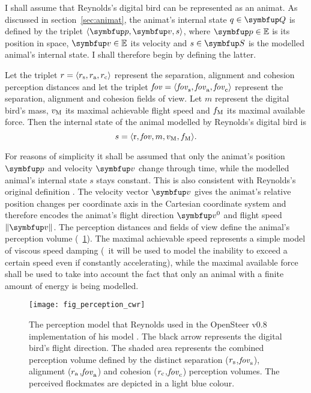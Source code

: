 I shall assume that Reynolds's digital bird can be represented as an animat. As discussed in section~\ref{sec:animat}, the animat's internal state $q \in \set{Q}$ is defined by the triplet $\langle\vect{p},\vect{v},s\rangle$, where $\vect{p} \in \E$ is its position in space, $\vect{v} \in \E$ its velocity and $s \in \set{S}$ is the modelled animal's internal state. I shall therefore begin by defining the latter.

\begin{definition}
  \label{def:animat:s:cwr}
  Let the triplet $r=\langle r_\textnormal{s}, r_\textnormal{a}, r_\textnormal{c}\rangle$ represent the separation, alignment and cohesion perception distances and let the triplet $\mathit{fov}=\langle\mathit{fov}_\textnormal{s}, \mathit{fov}_\textnormal{a}, \mathit{fov}_\textnormal{c}\rangle$ represent the separation, alignment and cohesion fields of view. Let $m$ represent the digital bird's mass, $v_\textnormal{M}$ its maximal achievable flight speed and $f_\textnormal{M}$ its maximal available force. Then the internal state of the animal modelled by Reynolds's digital bird is
  \begin{equation}
  s=\langle \mathrm{r}, \mathit{fov}, m, v_\textnormal{M}, f_\textnormal{M} \rangle.
  \end{equation}
\end{definition}

For reasons of simplicity it shall be assumed that only the animat's position $\vect{p}$ and velocity $\vect{v}$ change through time, while the modelled animal's internal state $s$ stays constant. This is also consistent with Reynolds's original definition \cite{reynolds:1987}. The velocity vector $\vect{v}$ gives the animat's relative position changes per coordinate axis in the Cartesian coordinate system and therefore encodes the animat's flight direction $\vect{v}^0$ and flight speed $\left\|\vect{v}\right\|$. The perception distances and fields of view define the animal's perception volume (\fig~\ref{fig:perception:cwr}). The maximal achievable speed represents a simple model of viscous speed damping (\ie\ it will be used to model the inability to exceed a certain speed even if constantly accelerating), while the maximal available force shall be used to take into account the fact that only an animal with a finite amount of energy is being modelled.

\begin{figure}
  \texttt{[image: fig\_perception\_cwr]}
  \caption{The perception model that Reynolds used in the OpenSteer v0.8 implementation of his model \cite{reynolds:1999}. The black arrow represents the digital bird's flight direction. The shaded area represents the combined perception volume defined by the distinct separation ($r_\textnormal{s}$,$\mathit{fov}_\textnormal{s}$), alignment ($r_\textnormal{a}$,$\mathit{fov}_\textnormal{a}$) and cohesion ($r_\textnormal{c}$,$\mathit{fov}_\textnormal{c}$) perception volumes. The perceived flockmates are depicted in a light blue colour.}
  \label{fig:perception:cwr}
\end{figure}

